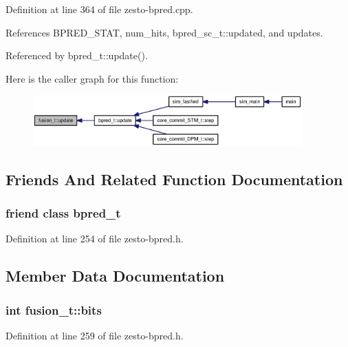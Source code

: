 Definition at line 364 of file zesto-bpred.cpp.

References BPRED\_\-STAT, num\_\-hits, bpred\_\-sc\_\-t::updated, and updates.

Referenced by bpred\_\-t::update().

Here is the caller graph for this function:\nopagebreak
\begin{figure}[H]
\begin{center}
\leavevmode
\includegraphics[width=293pt]{classfusion__t_cdf80727ed478611329437f387895bc4_icgraph}
\end{center}
\end{figure}


\subsection{Friends And Related Function Documentation}
\subsubsection[{bpred\_\-t}]{\setlength{\rightskip}{0pt plus 5cm}friend class {\bf bpred\_\-t}\hspace{0.3cm}{\tt  [friend]}}\label{classfusion__t_44319d3cf67079457eb46e2c6fcfeb49}




Definition at line 254 of file zesto-bpred.h.

\subsection{Member Data Documentation}
\subsubsection[{bits}]{\setlength{\rightskip}{0pt plus 5cm}int {\bf fusion\_\-t::bits}\hspace{0.3cm}{\tt  [protected]}}\label{classfusion__t_da3872e69676e0d38f54db3f549d471b}




Definition at line 259 of file zesto-bpred.h.


